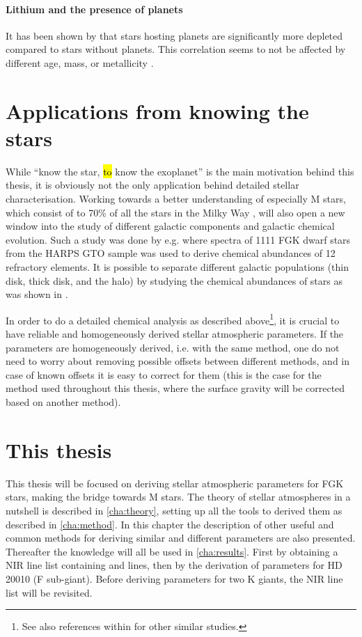 \paragraph{Lithium and the presence of planets}

It has been shown by \citep{Israelian2004,Delgado2014} that stars hosting planets are significantly
more  depleted compared to stars without planets. This correlation seems to not be
affected by different age, mass, or metallicity \citep{Sousa2010}.



\section{Applications from knowing the stars}
\label{sec:stars_application}

While ``know the star, \hl{to} know the exoplanet'' is the main motivation behind this thesis, it is
obviously not the only application behind detailed stellar characterisation. Working towards a
better understanding of especially M stars, which consist of to 70\% of all the stars in the Milky
Way \citep{Bochanski2010}, will also open a new window into the study of different galactic
components and galactic chemical evolution. Such a study was done by e.g. \citet{Adibekyan2012}
where spectra of 1111 FGK dwarf stars from the HARPS GTO sample was used to derive chemical
abundances of 12 refractory elements. It is possible to separate different galactic populations
(thin disk, thick disk, and the halo) by studying the chemical abundances of stars as was shown in
\citet{Adibekyan2012}.

In order to do a detailed chemical analysis as described above\footnote{See also references within
\citet{Adibekyan2012} for other similar studies.}, it is crucial to have reliable and homogeneously
derived stellar atmospheric parameters. If the parameters are homogeneously derived, i.e. with the
same method, one do not need to worry about removing possible offsets between different methods, and
in case of known offsets it is easy to correct for them (this is the case for the method used
throughout this thesis, where the surface gravity will be corrected based on another method).


\section{This thesis}
\label{sec:this_thesis}

This thesis will be focused on deriving stellar atmospheric parameters for FGK stars, making the
bridge towards M stars. The theory of stellar atmospheres in a nutshell is described in
\cref{cha:theory}, setting up all the tools to derived them as described in \cref{cha:method}. In
this chapter the description of other useful and common methods for deriving similar and different
parameters are also presented. Thereafter the knowledge will all be used in \cref{cha:results}.
First by obtaining a NIR line list containing  and  lines, then by the
derivation of parameters for HD 20010 (F sub-giant). Before deriving parameters for two K giants,
the NIR line list will be revisited.

